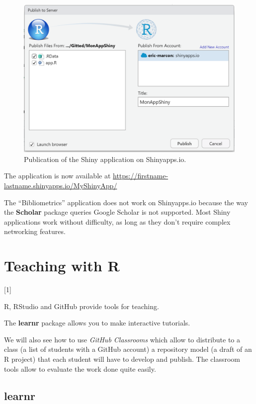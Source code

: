 \documentclass[
  12pt,
  american,
  a4paper,
  extrafontsizes,onecolumn,openright
  ]{memoir}
\newcommand{\toc}[1]{%
  \startcontents[chapters]%
  \printcontents[chapters]{}{1}[#1]{}%
  ~\newline%
}
\begin{document}
\scriptsize

\begin{figure}

{\centering \includegraphics[width=0.8\linewidth]{images/shiny-publish} 

}

\caption{Publication of the Shiny application on Shinyapps.io.}\label{fig:shiny-publish}
\end{figure}

\normalsize

The application is now available at \url{https://firstname-lastname.shinyapps.io/MyShinyApp/}

The \enquote{Bibliometrics} application does not work on Shinyapps.io because the way the \textbf{Scholar} package queries Google Scholar is not supported.
Most Shiny applications work without difficulty, as long as they don't require complex networking features.

\hypertarget{chap-enseigner}{%
\chapter{Teaching with R}\label{chap-enseigner}}

\toc{1}

R, RStudio and GitHub provide tools for teaching.

The \textbf{learnr} package allows you to make interactive tutorials.

We will also see how to use \emph{GitHub Classrooms} which allow to distribute to a class (a list of students with a GitHub account) a repository model (a draft of an R project) that each student will have to develop and publish.
The classroom tools allow to evaluate the work done quite easily.

\hypertarget{learnr}{%
\section{learnr}\label{learnr}}
\end{document}
